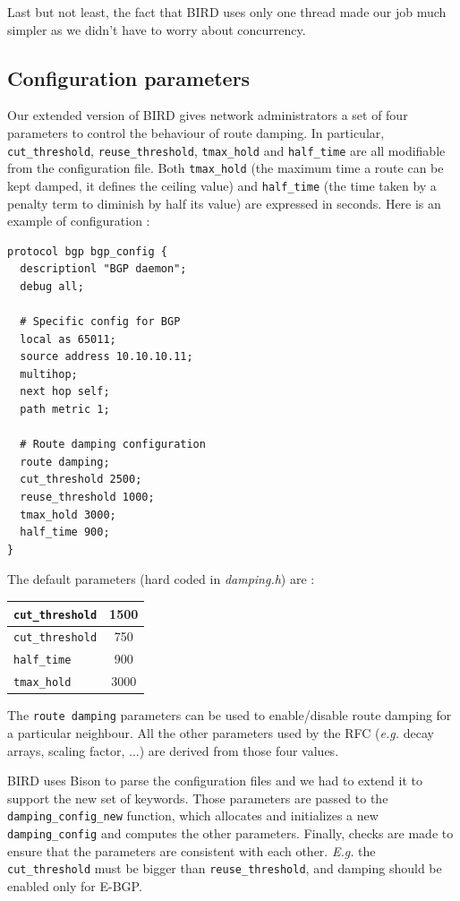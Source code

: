 \documentclass[a4paper,english]{IEEEtran}
\begin{document}
Last but not least, the fact that BIRD uses only one thread made our job much 
simpler as we didn't have to worry about concurrency.

\subsection{Configuration parameters}

Our extended version of BIRD gives network administrators a set of four 
parameters to control the behaviour of route damping.
In particular, {\tt\small cut\_threshold}, {\tt\small reuse\_threshold},
{\tt\small tmax\_hold} and {\tt\small half\_time} are all modifiable
from the configuration file.
Both {\tt\small tmax\_hold} (the maximum time a route can be kept damped, 
it defines the ceiling value) and {\tt\small half\_time} (the time taken by
a penalty term to diminish by half its value) are expressed in seconds.
Here is an example of configuration :

\begin{verbatim}
protocol bgp bgp_config {
  descriptionl "BGP daemon";
  debug all;

  # Specific config for BGP
  local as 65011;
  source address 10.10.10.11;
  multihop;
  next hop self;
  path metric 1;
 
  # Route damping configuration
  route damping;
  cut_threshold 2500;
  reuse_threshold 1000;
  tmax_hold 3000;
  half_time 900;
}
\end{verbatim}

The default parameters (hard coded in \textsl{damping.h}) are :

\begin{center}
\begin{tabular}{|l|c|}
\hline
\texttt{\small cut\_threshold} & 1500 \\
\hline
\texttt{\small cut\_threshold} & 750 \\
\hline
\texttt{\small half\_time} & 900 \\
\hline
\texttt{\small tmax\_hold} & 3000 \\
\hline
\end{tabular}
\end{center}

The {\tt\small route damping} parameters can be used to enable/disable
route damping for a particular neighbour. All the other parameters used by
the RFC (\textit{e.g.} decay arrays, scaling factor, ...) are derived from
those four values.

BIRD uses Bison to parse the configuration files and we had to extend it 
to support the new set of keywords. Those parameters are passed to the 
{\tt\small damping\_config\_new} function, which allocates and initializes 
a new {\tt\small damping\_config} and computes the other parameters.
Finally, checks are made to ensure that the parameters are consistent with 
each other. \textit{E.g.} the \texttt{\small cut\_threshold} must be bigger
than \texttt{\small reuse\_threshold}, and damping should be enabled only for E-BGP.
\end{document}

